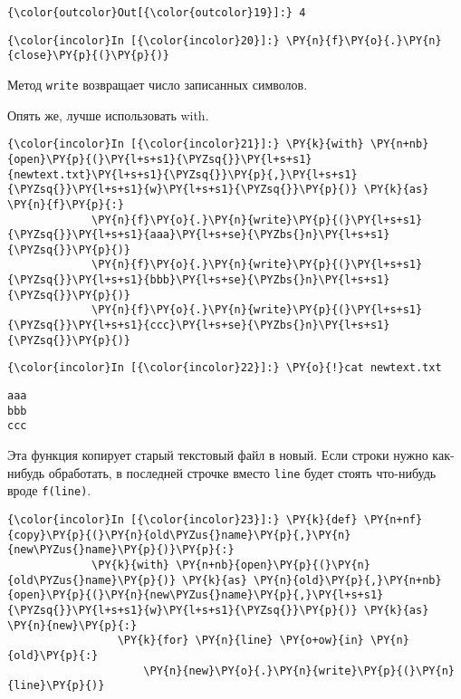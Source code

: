             \begin{Verbatim}[commandchars=\\\{\}]
{\color{outcolor}Out[{\color{outcolor}19}]:} 4
\end{Verbatim}
        
    \begin{Verbatim}[commandchars=\\\{\}]
{\color{incolor}In [{\color{incolor}20}]:} \PY{n}{f}\PY{o}{.}\PY{n}{close}\PY{p}{(}\PY{p}{)}
\end{Verbatim}

    Метод \texttt{write} возвращает число записанных символов.

Опять же, лучше использовать with.

    \begin{Verbatim}[commandchars=\\\{\}]
{\color{incolor}In [{\color{incolor}21}]:} \PY{k}{with} \PY{n+nb}{open}\PY{p}{(}\PY{l+s+s1}{\PYZsq{}}\PY{l+s+s1}{newtext.txt}\PY{l+s+s1}{\PYZsq{}}\PY{p}{,}\PY{l+s+s1}{\PYZsq{}}\PY{l+s+s1}{w}\PY{l+s+s1}{\PYZsq{}}\PY{p}{)} \PY{k}{as} \PY{n}{f}\PY{p}{:}
             \PY{n}{f}\PY{o}{.}\PY{n}{write}\PY{p}{(}\PY{l+s+s1}{\PYZsq{}}\PY{l+s+s1}{aaa}\PY{l+s+se}{\PYZbs{}n}\PY{l+s+s1}{\PYZsq{}}\PY{p}{)}
             \PY{n}{f}\PY{o}{.}\PY{n}{write}\PY{p}{(}\PY{l+s+s1}{\PYZsq{}}\PY{l+s+s1}{bbb}\PY{l+s+se}{\PYZbs{}n}\PY{l+s+s1}{\PYZsq{}}\PY{p}{)}
             \PY{n}{f}\PY{o}{.}\PY{n}{write}\PY{p}{(}\PY{l+s+s1}{\PYZsq{}}\PY{l+s+s1}{ccc}\PY{l+s+se}{\PYZbs{}n}\PY{l+s+s1}{\PYZsq{}}\PY{p}{)}
\end{Verbatim}

    \begin{Verbatim}[commandchars=\\\{\}]
{\color{incolor}In [{\color{incolor}22}]:} \PY{o}{!}cat newtext.txt
\end{Verbatim}

    \begin{Verbatim}[commandchars=\\\{\}]
aaa
bbb
ccc

    \end{Verbatim}

    Эта функция копирует старый текстовый файл в новый. Если строки нужно
как-нибудь обработать, в последней строчке вместо \texttt{line} будет
стоять что-нибудь вроде \texttt{f(line)}.

    \begin{Verbatim}[commandchars=\\\{\}]
{\color{incolor}In [{\color{incolor}23}]:} \PY{k}{def} \PY{n+nf}{copy}\PY{p}{(}\PY{n}{old\PYZus{}name}\PY{p}{,}\PY{n}{new\PYZus{}name}\PY{p}{)}\PY{p}{:}
             \PY{k}{with} \PY{n+nb}{open}\PY{p}{(}\PY{n}{old\PYZus{}name}\PY{p}{)} \PY{k}{as} \PY{n}{old}\PY{p}{,}\PY{n+nb}{open}\PY{p}{(}\PY{n}{new\PYZus{}name}\PY{p}{,}\PY{l+s+s1}{\PYZsq{}}\PY{l+s+s1}{w}\PY{l+s+s1}{\PYZsq{}}\PY{p}{)} \PY{k}{as} \PY{n}{new}\PY{p}{:}
                 \PY{k}{for} \PY{n}{line} \PY{o+ow}{in} \PY{n}{old}\PY{p}{:}
                     \PY{n}{new}\PY{o}{.}\PY{n}{write}\PY{p}{(}\PY{n}{line}\PY{p}{)}
\end{Verbatim}

